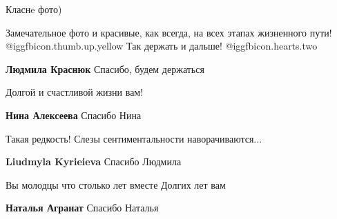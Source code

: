  
 
 
 
 

Класнe фото)


Замечательное фото и красивые, как всегда, на всех этапах жизненного пути! @igg{fbicon.thumb.up.yellow} 
Так держать и дальше! @igg{fbicon.hearts.two} 

\textbf{Людмила Краснюк} Спасибо, будем держаться

Долгой и счастливой жизни вам!

\textbf{Нина Алексеева} Спасибо Нина

Такая редкость!
Слезы сентиментальности наворачиваются...

\textbf{Liudmyla Kyrieieva} Спасибо Людмила

Вы молодцы что столько лет вместе Долгих лет вам

\textbf{Наталья Агранат} Спасибо Наталья
